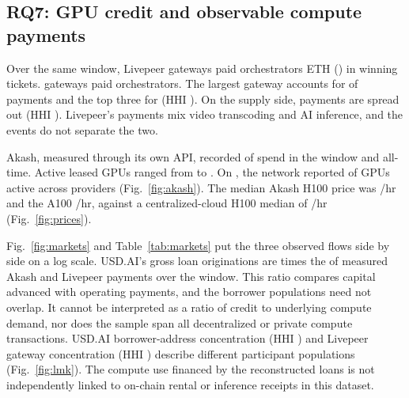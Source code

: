 \subsection{RQ7: GPU credit and observable compute payments}
Over the same window, Livepeer gateways paid orchestrators \LPETH{} ETH (\LPUSD{}) in \LPTickets{} winning tickets. \LPGateways{} gateways paid \LPOrchestrators{} orchestrators. The largest gateway accounts for \LPTopGateway{} of payments and the top three for \LPTopThree{} (HHI \LPHHIG{}). On the supply side, payments are spread out (HHI \LPHHIO{}). Livepeer's payments mix video transcoding and AI inference, and the events do not separate the two.

Akash, measured through its own API, recorded \AKUSD{} of spend in the window and \AKAllTime{} all-time. Active leased GPUs ranged from \AKGPUMin{} to \AKGPUMax{}. On \AKRetrieved{}, the network reported \AKGPUNow{} of \AKGPUTotal{} GPUs active across \AKProviders{} providers (Fig.~\ref{fig:akash}). The median Akash H100 price was \AKHundred{}/hr and the A100 \AKAHundred{}/hr, against a centralized-cloud H100 median of \CentralH{}/hr (Fig.~\ref{fig:prices}).

Fig.~\ref{fig:markets} and Table~\ref{tab:markets} put the three observed flows side by side on a log scale. USD.AI's gross loan originations are \CreditMultiple{} times the \ComputeSpend{} of measured Akash and Livepeer payments over the window. This ratio compares capital advanced with operating payments, and the borrower populations need not overlap. It cannot be interpreted as a ratio of credit to underlying compute demand, nor does the sample span all decentralized or private compute transactions. USD.AI borrower-address concentration (HHI \HHIOrig{}) and Livepeer gateway concentration (HHI \LPHHIG{}) describe different participant populations (Fig.~\ref{fig:lmk}). The compute use financed by the reconstructed loans is not independently linked to on-chain rental or inference receipts in this dataset.

